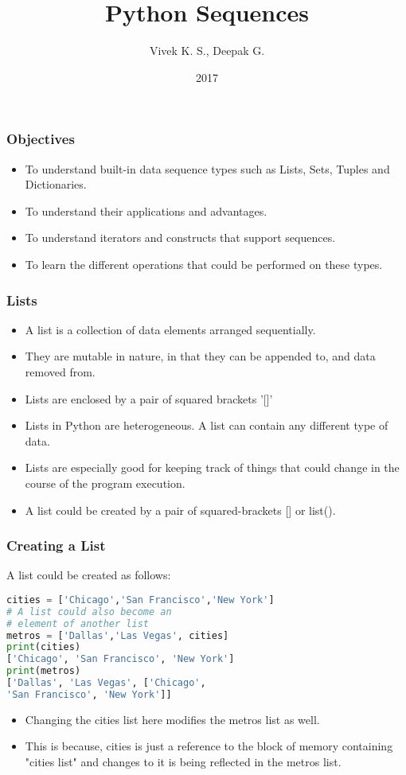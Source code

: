 \documentclass{beamer}
\title{Python Sequences}
\author{Vivek K. S., Deepak G.}
\institute{Information Systems Decision Sciences (ISDS)\\
MUMA College of Business\\
University of South Florida \\
Tampa, Florida}
\date{2017}
\begin{document}
\frame{\titlepage}
\begin{frame}
\frametitle{Objectives}
\begin{itemize}
\item To understand built-in data sequence types such as Lists, Sets, Tuples and Dictionaries.
\item To understand their applications and advantages.
\item To understand iterators and constructs that support sequences.
\item To learn the different operations that could be performed on these types.
\end{itemize}
\end{frame}
\begin{frame}
\frametitle{Lists}
\begin{itemize}
\item A list is a collection of data elements arranged sequentially.
\item They are mutable in nature, in that they can be appended to, and data removed from.
\item Lists are enclosed by a pair of squared brackets '[]'
\item Lists in Python are heterogeneous. A list can contain any different type of data.
\item Lists are especially good for keeping track of things that could change in the course of the program execution.
\item A list could be created by a pair of squared-brackets [] or list().
\end{itemize}
\end{frame}


\begin{frame}[fragile]
\frametitle{Creating a List}
A list could be created as follows:
\begin{lstlisting}[language=Python]
cities = ['Chicago','San Francisco','New York']
# A list could also become an 
# element of another list 
metros = ['Dallas','Las Vegas', cities]
print(cities)
['Chicago', 'San Francisco', 'New York']
print(metros)
['Dallas', 'Las Vegas', ['Chicago', 
'San Francisco', 'New York']]
\end{lstlisting}
\begin{itemize}
\item Changing the cities list here modifies the  metros list as well.
\item This is because, cities is just a reference to the block of memory containing "cities list" and changes to it is being reflected in the metros list.
\end{itemize}
\end{frame}
\end{document}
